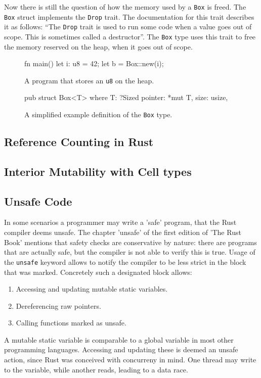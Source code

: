 \documentclass[twocolumn]{article}
\begin{document}
Now there is still the question of how the memory used by a \texttt{Box} is freed.
The \texttt{Box} struct implements the \texttt{Drop} trait.
The documentation for this trait describes it as follows: ``The \texttt{Drop} trait is used to run some code when a value goes out of scope. This is sometimes called a destructor''\cite{RustDoc-Drop}.
The \texttt{Box} type uses this trait to free the memory reserved on the heap, when it goes out of scope.
\begin{figure}
\begin{rustcode}
fn main() {
    let i: u8 = 42;
    let b = Box::new(i);
}
\end{rustcode}
\vspace{-2em}
\caption{A program that stores an \texttt{u8} on the heap.}
\label{box-example}
\end{figure}
\begin{figure}
\begin{rustcode}
pub struct Box<T> where T: ?Sized {
    pointer: *mut T,
    size: usize,
}
\end{rustcode}
\vspace{-2em}
\caption{A simplified example definition of the \texttt{Box} type.}
\label{box-definition}
\end{figure}
\subsection{Reference Counting in Rust}
\subsection{Interior Mutability with Cell types}
\subsection{Unsafe Code}
\label{unsafe}
In some scenarios a programmer may write a 'safe' program, that the Rust compiler deems unsafe.
The chapter 'unsafe' of the first edition of 'The Rust Book' \cite{RustBook-Unsafe} mentions that safety checks are conservative by nature: there are programs that are actually safe, but the compiler is not able to verify this is true.
Usage of the \texttt{unsafe} keyword allows to notify the compiler to be less strict in the block that was marked.
Concretely such a designated block allows:
\begin{enumerate}
        \item Accessing and updating mutable static variables.
        \item Dereferencing raw pointers.
        \item Calling functions marked as unsafe.
\end{enumerate}
A mutable static variable is comparable to a global variable in most other programming languages.
Accessing and updating these is deemed an unsafe action, since Rust was conceived with concurreny in mind.
One thread may write to the variable, while another reads, leading to a data race.
\end{document}
